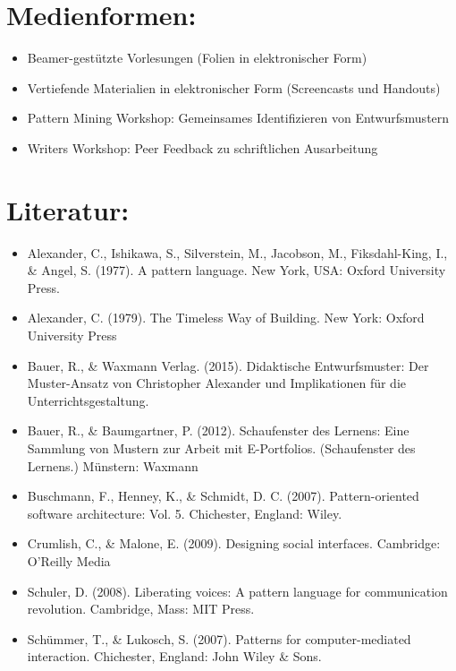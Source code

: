 \section*{Medienformen:}\label{medienformen-12}

\begin{itemize}
\tightlist
\item
  Beamer-gestützte Vorlesungen (Folien in elektronischer Form)
\item
  Vertiefende Materialien in elektronischer Form (Screencasts und
  Handouts)
\item
  Pattern Mining Workshop: Gemeinsames Identifizieren von
  Entwurfsmustern
\item
  Writers Workshop: Peer Feedback zu schriftlichen Ausarbeitung
\end{itemize}

\section*{Literatur:}\label{literatur-12}

\begin{itemize}
\tightlist
\item
  Alexander, C., Ishikawa, S., Silverstein, M., Jacobson, M.,
  Fiksdahl-King, I., \& Angel, S. (1977). A pattern language. New York,
  USA: Oxford University Press.
\item
  Alexander, C. (1979). The Timeless Way of Building. New York: Oxford
  University Press
\item
  Bauer, R., \& Waxmann Verlag. (2015). Didaktische Entwurfsmuster: Der
  Muster-Ansatz von Christopher Alexander und Implikationen für die
  Unterrichtsgestaltung.
\item
  Bauer, R., \& Baumgartner, P. (2012). Schaufenster des Lernens: Eine
  Sammlung von Mustern zur Arbeit mit E-Portfolios. (Schaufenster des
  Lernens.) Münstern: Waxmann
\item
  Buschmann, F., Henney, K., \& Schmidt, D. C. (2007). Pattern-oriented
  software architecture: Vol. 5. Chichester, England: Wiley.
\item
  Crumlish, C., \& Malone, E. (2009). Designing social interfaces.
  Cambridge: O'Reilly Media
\item
  Schuler, D. (2008). Liberating voices: A pattern language for
  communication revolution. Cambridge, Mass: MIT Press.
\item
  Schümmer, T., \& Lukosch, S. (2007). Patterns for computer-mediated
  interaction. Chichester, England: John Wiley \& Sons.
\end{itemize}

